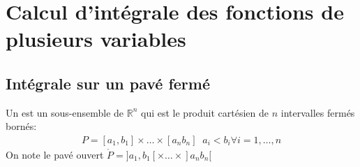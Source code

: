 \chapter{Calcul d'intégrale des fonctions de plusieurs variables}

\section{Intégrale sur un pavé fermé}
\begin{definition}
    Un  est un sous-ensemble de $\mathbb{R}^{n}$ qui est le produit cartésien de $n$ intervalles fermés bornés:
    \begin{align*} P =  \left[a_1, b_1\right] \times \ldots \times \left[a_n b_n\right] \; \; a_i < b_i \forall i = 1, \ldots, n\end{align*}
    On note le pavé ouvert $\mathring{P} =  ] a_1, b_1 [ \times \ldots \times ] a_n b_n [$
\end{definition}


